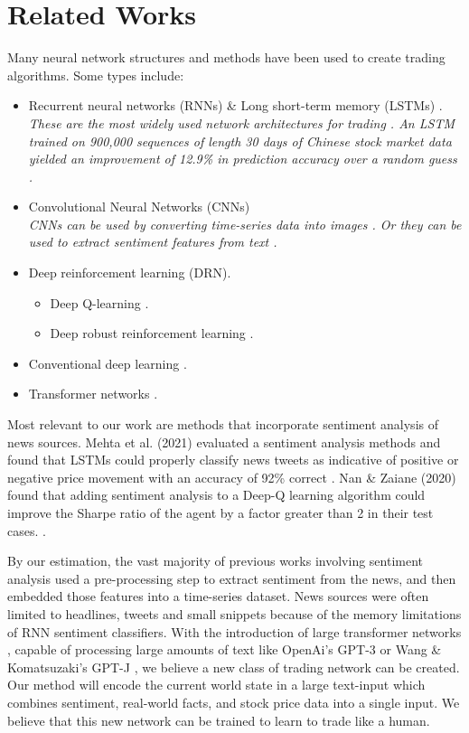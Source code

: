 \documentclass[conference]{IEEEtran}
\begin{document}
\section{Related Works}
Many neural network structures and methods have been used to create trading algorithms. Some types include: 
\begin{itemize}
	\item Recurrent neural networks (RNNs) \& Long short-term memory (LSTMs) \cite{Chen2017}\cite{Mehta2021}.
	      \\\emph{These are the most widely used network architectures for trading \cite{Gu2020}. An LSTM trained on 900,000 sequences of length 30 days of Chinese stock market data yielded an improvement of 12.9\% in prediction accuracy over a random guess \cite{Chen2015}.}
	\item Convolutional Neural Networks (CNNs) \cite{Gu2020}
	      \\\emph{CNNs can be used by converting time-series data into images \cite{Sezer2018}. Or they can be used to extract sentiment features from text \cite{Shi2020}.}
	\item Deep reinforcement learning (DRN).
	      \begin{itemize}
	      	\item Deep Q-learning \cite{Wang2017} \cite{Nan2020}.
	      	\item Deep robust reinforcement learning \cite{Li2019}.
	      \end{itemize}
	\item Conventional deep learning \cite{Day2016}.
	\item Transformer networks \cite{Schmitz2020}.
\end{itemize}

Most relevant to our work are methods that incorporate sentiment analysis of news sources. Mehta et al. (2021) evaluated a sentiment analysis methods and found that LSTMs could properly classify news tweets as indicative of positive or negative price movement with an accuracy of 92\% correct \cite{Mehta2021}. Nan \& Zaiane (2020) found that adding sentiment analysis to a Deep-Q learning algorithm could improve the Sharpe ratio of the agent by a factor greater than 2 in their test cases. \cite{Nan2020}.

By our estimation, the vast majority of previous works involving sentiment analysis used a pre-processing step to extract sentiment from the news, and then embedded those features into a time-series dataset. News sources were often limited to headlines, tweets and small snippets because of the memory limitations of RNN sentiment classifiers. With the introduction of large transformer networks \cite{Vaswani2017}, capable of processing large amounts of text like OpenAi's GPT-3 \cite{Brown2020} or Wang \& Komatsuzaki's GPT-J \cite{gpt-j}, we believe a new class of trading network can be created. Our method will encode the current world state in a large text-input which combines sentiment, real-world facts, and stock price data into a single input. We believe that this new network can be trained to learn to trade like a human.
\end{document}
